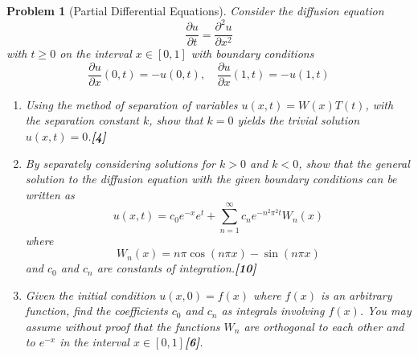 \documentclass[a4paper]{article}
\theoremstyle{new}
\newtheorem{qns}{Problem}[section]
\begin{document}
\begin{qns}[Partial Differential Equations]\leavevmode
Consider the diffusion equation
$$\frac{\partial u}{\partial t}=\frac{\partial^2u}{\partial x^2}$$
with $t\geq0$ on the interval $x\in[0,1]$ with boundary conditions
$$\frac{\partial u}{\partial x}(0,t)=-u(0,t),\quad \frac{\partial u}{\partial x}(1,t)=-u(1,t)$$
\begin{enumerate}[label=(\roman*)]
\item Using the method of separation of variables $u(x, t) = W(x)T(t)$, with the separation constant $k$, show that $k = 0$ yields the trivial solution $u(x, t) = 0$.\hfill\textbf{[4]}
\item By separately considering solutions for $k > 0$ and $k < 0$, show that the general solution to the diffusion equation with the given boundary conditions can be written as
$$u(x,t)=c_0e^{-x}e^t+\sum_{n=1}^\infty c_ne^{-n^2\pi^2t}W_n(x)$$
where 
$$W_n(x) = n\pi \cos(n\pi x) − \sin(n\pi x)$$
and $c_0$ and $c_n$ are constants of integration.\hfill\textbf{[10]}
\item Given the initial condition $u(x, 0) = f(x)$ where $f(x)$ is an arbitrary function, find the coefficients $c_0$ and $c_n$ as integrals involving $f(x)$. You may assume without proof that the functions $W_n$ are orthogonal to each other and to $e^{-x}$ in the interval $x\in[0,1]$\hfill\textbf{[6]}.
\end{enumerate}
\end{qns}
\end{document}
